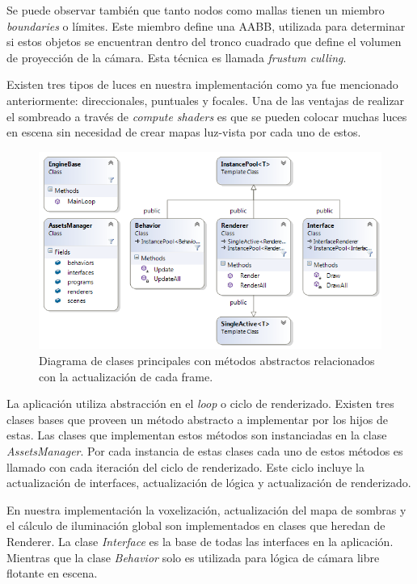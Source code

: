 Se puede observar también que tanto nodos como mallas tienen un miembro \emph{boundaries} o límites. Este miembro define una \ac{AABB}, utilizada para determinar si estos objetos se encuentran dentro del tronco cuadrado que define el volumen de proyección de la cámara. Esta técnica es llamada \emph{frustum culling}. 

Existen tres tipos de luces en nuestra implementación como ya fue mencionado anteriormente: direccionales, puntuales y focales. Una de las ventajas de realizar el sombreado a través de \emph{compute shaders} es que se pueden colocar muchas luces en escena sin necesidad de crear mapas luz-vista por cada uno de estos.

\begin{figure}[H]
	\centering
	\captionsetup{justification=centering}
	\includegraphics[width=\linewidth]{media/ClassDiagram.png}
	\caption{Diagrama de clases principales con métodos abstractos relacionados con la actualización de cada frame.}
	\label{fig:frame_classes}
\end{figure}

La aplicación utiliza abstracción en el \emph{loop} o ciclo de renderizado. Existen tres clases bases que proveen un método abstracto a implementar por los hijos de estas. Las clases que implementan estos métodos son instanciadas en la clase \emph{AssetsManager}. Por cada instancia de estas clases cada uno de estos métodos es llamado con cada iteración del ciclo de renderizado. Este ciclo incluye la actualización de interfaces, actualización de lógica y actualización de renderizado.

En nuestra implementación la voxelización, actualización del mapa de sombras y el cálculo de iluminación global son implementados en clases que heredan de Renderer. La clase \emph{Interface} es la base de todas las interfaces en la aplicación. Mientras que la clase \emph{Behavior} solo es utilizada para lógica de cámara libre flotante en escena.


